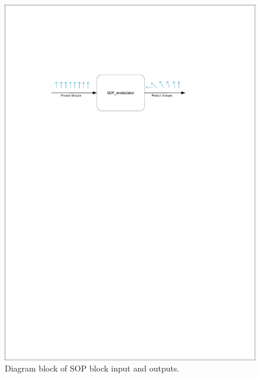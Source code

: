 \begin{refsection}
\begin{figure}[H]
    \centering
        \includegraphics[clip, trim=1cm 20cm 1cm 5.5cm, width=1.00\textwidth]{./lib/sop_modulator/figures/sop.pdf}
    \caption{Diagram block of SOP block input and outputs.}\label{sop}
  \end{figure}


\end{refsection}
